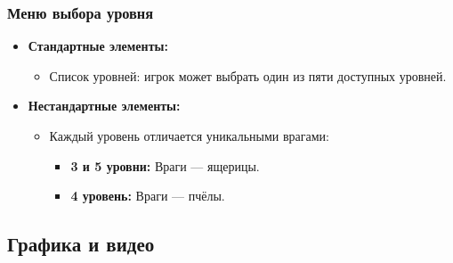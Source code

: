 \documentclass{article}
\begin{document}
\subsubsection{Меню выбора уровня}
\begin{itemize}
    \item \textbf{Стандартные элементы:}
    \begin{itemize}
        \item Список уровней: игрок может выбрать один из пяти доступных уровней.
    \end{itemize}
    \item \textbf{Нестандартные элементы:}
    \begin{itemize}
        \item Каждый уровень отличается уникальными врагами:
        \begin{itemize}
            \item \textbf{3 и 5 уровни:} Враги — ящерицы.
            \item \textbf{4 уровень:} Враги — пчёлы.
        \end{itemize}
    \end{itemize}
\end{itemize}

\subsection{Графика и видео}
\end{document}
